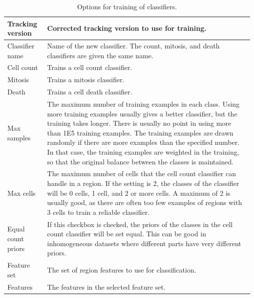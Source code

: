 \documentclass[a4paper, oneside, onecolumn, 11pt]{article}
\begin{document}
\begin{table}[!htb]
\caption{Options for training of classifiers.}
\label{tab:classifier-training}
\begin{tabularx}{\textwidth}{lX}
\hline
Tracking version & Corrected tracking version to use for training. \\[5pt] \hline

Classifier name & Name of the new classifier. The count, mitosis, and death classifiers are given the same name. \\[5pt] \hline

Cell count & Trains a cell count classifier. \\[5pt] \hline

Mitosis &  Trains a mitosis classifier. \\[5pt] \hline

Death &  Trains a cell death classifier. \\[5pt] \hline

Max samples & The maximum number of training examples in each class. Using more training examples usually gives a better classifier, but the training takes longer. There is usually no point in using more than 1E5 training examples. The training examples are drawn randomly if there are more examples than the specified number. In that case, the training examples are weighted in the training, so that the original balance between the classes is maintained. \\[5pt] \hline

Max cells & The maximum number of cells that the cell count classifier can handle in a region. If the setting is 2, the classes of the classifier will be 0 cells, 1 cell, and 2 or more cells. A maximum of 2 is usually good, as there are often too few examples of regions with 3 cells to train a reliable classifier. \\[5pt] \hline

Equal count priors & If this checkbox is checked, the priors of the classes in the cell count classifier will be set equal. This can be good in inhomogeneous datasets where different parts have very different priors. \\[5pt] \hline

Feature set & The set of region features to use for classification. \\[5pt] \hline

Features &  The features in the selected feature set. \\[5pt] \hline
\end{tabularx}
\end{table}
\end{document}
